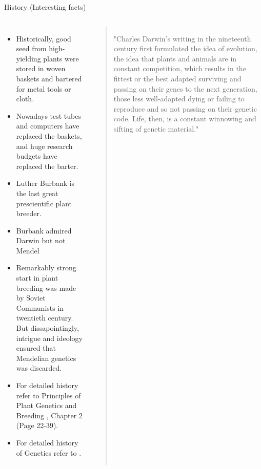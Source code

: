 \documentclass[11pt,ignorenonframetext,aspectratio=169]{beamer}
\providecommand{\tightlist}{%
  \setlength{\itemsep}{0pt}\setlength{\parskip}{0pt}}
\newcommand{\bcolumns}{\begin{columns}[T, onlytextwidth]}
\newcommand{\ecolumns}{\end{columns}}
\begin{document}
\begin{frame}{History (Interesting facts)}
\protect\hypertarget{history-interesting-facts}{}
\bcolumns
{}
\small

\begin{itemize}
\tightlist
\item
  Historically, good seed from high-yielding plants were stored in woven
  baskets and bartered for metal tools or cloth.
\item
  Nowadays test tubes and computers have replaced the baskets, and huge
  research budgets have replaced the barter.
\item
  Luther Burbank is the last great prescientific plant breeder.
\item
  Burbank admired Darwin but not Mendel
\item
  Remarkably strong start in plant breeding was made by Soviet
  Communists in twentieth century. But dissapointingly, intrigue and
  ideology ensured that Mendelian genetics was discarded.
\item
  For detailed history refer to Principles of Plant Genetics and
  Breeding \autocite{acquaah2009principles}, Chapter 2 (Page 22-39).
\item
  For detailed history of Genetics refer to
  \textcite{griffiths2015introduction} .
\end{itemize}

\begin{quote}
\scriptsize
"Charles Darwin's writing in the nineteenth century first formulated the idea of evolution, the idea that plants and animals are in constant competition, which results in the fittest or the best adapted surviving and passing on their genes to the next generation, those less well-adapted dying or failing to reproduce and so not passing on their genetic code. Life, then, is a constant winnowing and sifting of genetic material." 
\end{quote}

\ecolumns
\end{frame}
\end{document}

